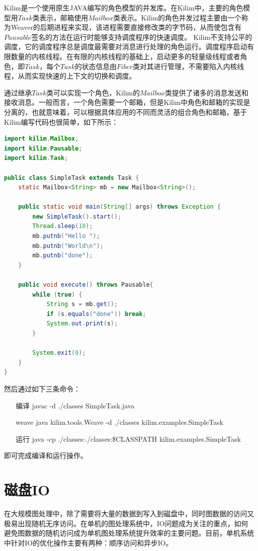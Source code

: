 Kilim是一个使用原生JAVA编写的角色模型的并发库。在Kilim中，主要的角色模型用$Task$类表示，邮箱使用$Mailbox$类表示。Kilim的角色并发过程主要由一个称为Weaver的后期进程来实现，该进程需要直接修改类的字节码，从而使包含有$Pausable$签名的方法在运行时能够支持调度程序的快速调度。
Kilim不支持公平的调度，它的调度程序总是调度最需要对消息进行处理的角色运行。调度程序启动有限数量的内核线程。在有限的内核线程的基础上，启动更多的轻量级线程或者角色，即$Task$，每个$Task$的状态信息由$Fiber$类对其进行管理，不需要陷入内核线程，从而实现快速的上下文的切换和调度。

通过继承$Task$类可以实现一个角色，Kilim的$Mailbox$类提供了诸多的消息发送和接收消息。一般而言，一个角色需要一个邮箱，但是Kilim中角色和邮箱的实现是分离的，也就意味着，可以根据具体应用的不同而灵活的组合角色和邮箱，基于Kilim编写代码也很简单，如下所示：

\begin{lstlisting}[language=JAVA]
import kilim.Mailbox;
import kilim.Pausable;
import kilim.Task;

public class SimpleTask extends Task {
    static Mailbox<String> mb = new Mailbox<String>();
    
    public static void main(String[] args) throws Exception {
        new SimpleTask().start();
        Thread.sleep(10);
        mb.putnb("Hello ");
        mb.putnb("World\n");
        mb.putnb("done");
    }

    public void execute() throws Pausable{
        while (true) {
            String s = mb.get();
            if (s.equals("done")) break;
            System.out.print(s);
        }
        
        System.exit(0);
    }
}
\end{lstlisting}


然后通过如下三条命令：
\begin{itemize}
\item [编译] javac -d ./classes SimpleTask.java
 \item [weave]   java kilim.tools.Weave -d ./classes kilim.examples.SimpleTask
 \item [运行]     java -cp ./classes:./classes:\$CLASSPATH  kilim.examples.SimpleTask
\end{itemize}
即可完成编译和运行操作。

\section{磁盘IO}
在大规模图处理中，除了需要将大量的数据到写入到磁盘中，同时图数据的访问又极易出现随机无序访问。在单机的图处理系统中，IO问题成为关注的重点，如何避免图数据的随机访问成为单机图处理系统提升效率的主要问题。目前，单机系统中针对IO的优化操作主要有两种：顺序访问和异步IO。

